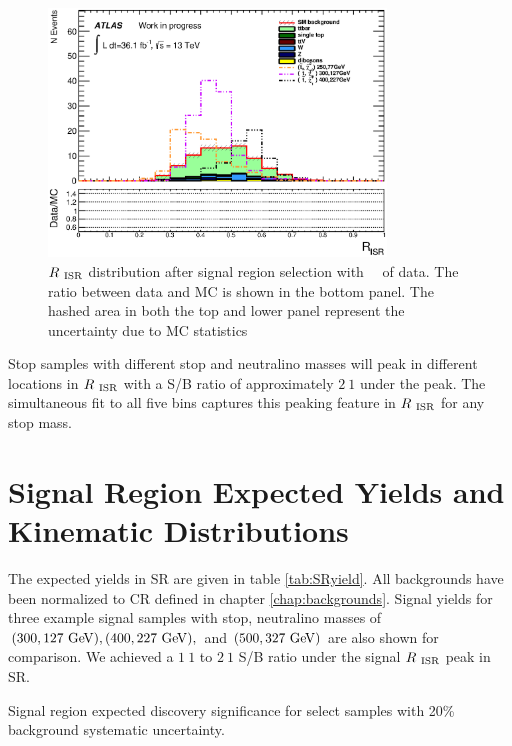 \begin{figure}[htbp]
  \begin{center}
     \includegraphics[width=0.80\textwidth]{figures/plotSR/SR_ND1_RISR_7SR.eps}
  \end{center}
  \caption{ $R_{~\mathrm{ISR}}$ distribution after signal region selection with \intlumi\ \ifb\ of data. The ratio between data and MC is shown in the bottom panel. The hashed area in both the top and lower panel represent the uncertainty due to MC statistics}
  \label{fig:SR:RISR}
\end{figure}

\indent Stop samples with different stop and neutralino masses will peak in different locations in $R_{~\mathrm{ISR}}$ with a S/B ratio of approximately $2\:1$ under the peak.  The simultaneous fit to all five bins captures this peaking feature in $R_{~\mathrm{ISR}}$ for any stop mass.  \\

\section{Signal Region Expected Yields and Kinematic Distributions}
\label{sec:SR:Yields}

\indent The expected yields in SR are given in table \ref{tab:SRyield}.  All backgrounds have been normalized to CR defined in chapter \ref{chap:backgrounds}.  Signal yields for three example signal samples with stop, neutralino masses of $(300,127 \gev), (400,227\gev), $ and $(500,327 \gev)$ are also shown for comparison.  We achieved a $1\:1$ to $2\:1$ S/B ratio under the signal $R_{~\mathrm{ISR}}$ peak in SR. \\

\begin{table}
  \begin{center}
    \def\arraystretch{1.4}%
    
    
    
    
    
  \end{center}
  \caption{Signal region expected discovery significance for select samples with 20\% background systematic uncertainty.}
  \label{tab:SRyield}
\end{table}

